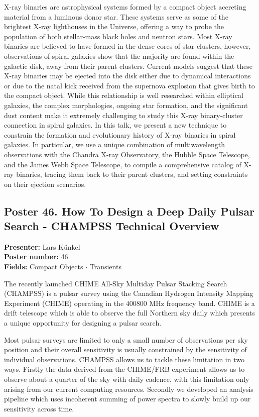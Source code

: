 X-ray binaries are astrophysical systems formed by a compact object accreting material from a luminous donor star. These systems serve as some of the brightest X-ray lighthouses in the Universe, offering a way to probe the population of both stellar-mass black holes and neutron stars. Most X-ray binaries are believed to have formed in the dense cores of star clusters, however, observations of spiral galaxies show that the majority are found within the galactic disk, away from their parent clusters. Current models suggest that these X-ray binaries may be ejected into the disk either due to dynamical interactions or due to the natal kick received from the supernova explosion that gives birth to the compact object. While this relationship is well researched within elliptical galaxies, the complex morphologies, ongoing star formation, and the significant dust content make it extremely challenging to study this X-ray binary-cluster connection in spiral galaxies. In this talk, we present a new technique to constrain the formation and evolutionary history of X-ray binaries in spiral galaxies. In particular, we use a unique combination of multiwavelength observations with the Chandra X-ray Observatory, the Hubble Space Telescope, and the James Webb Space Telescope, to compile a comprehensive catalog of X-ray binaries, tracing them back to their parent clusters, and setting constraints on their ejection scenarios.

\hypertarget{poster-abstract-talk-226}{}\label{poster-abstract-page-talk-226}
\subsection*{Poster 46. How To Design a Deep Daily Pulsar Search - CHAMPSS Technical Overview}
\textbf{Presenter:} Lars Künkel\\
\textbf{Poster number:} 46\\
\textbf{Fields:} Compact Objects $\cdot$ Transients

The recently launched CHIME All-Sky Multiday Pulsar Stacking Search (CHAMPSS) is a pulsar survey using the Canadian Hydrogen Intensity Mapping Experiment (CHIME) operating in the 400800 MHz frequency band. CHIME is a drift telescope which is able to observe the full Northern sky daily which presents a unique opportunity for designing a pulsar search.

Most pulsar surveys are limited to only a small number of observations per sky position and their overall sensitivity is usually constrained by the sensitivity of individual observations. CHAMPSS allows us to tackle these limitation in two ways. Firstly the data derived from the CHIME/FRB experiment allows us to observe about a quarter of the sky with daily cadence, with this limitation only arising from our current computing resources. Secondly we developed an analysis pipeline which uses incoherent summing of power spectra to slowly build up our sensitivity across time.

